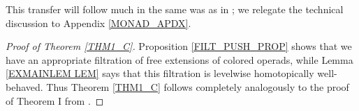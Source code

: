 \documentclass[a4paper,10pt
,draft
]{article}%
\renewcommand{\1}{\eta}%
\newcommand{\SC}{\Sigma_{\mathfrak C}}
\begin{document}
This transfer will follow much in the same was as in \cite{BP_geo};
we relegate the technical discussion to Appendix \ref{MONAD_APDX}.


      

\begin{proof}[Proof of Theorem \ref{THM1_C}]
      Proposition \ref{FILT_PUSH_PROP} shows that we have an appropriate filtration of free extensions of colored operads,
      while Lemma \ref{EXMAINLEM LEM} says that this filtration is levelwise homotopically well-behaved.
      Thus Theorem \ref{THM1_C} follows completely analogously to the proof of Theorem I from \cite{BP_geo}.
\end{proof}
\end{document}
